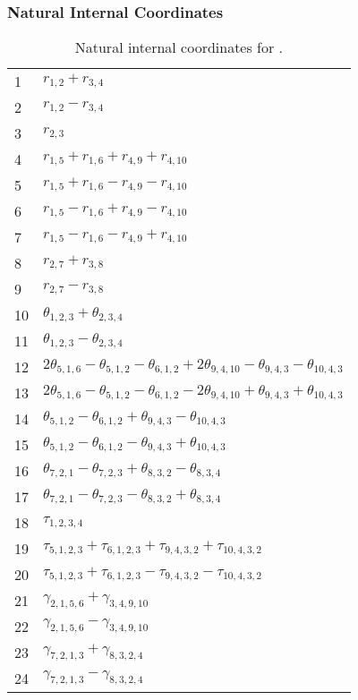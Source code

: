 \documentclass[10pt,oneside]{article}
\begin{document}
\begin{table}[h!]
\subsubsection*{Natural Internal Coordinates}
\centering
\caption{Natural internal coordinates for .}
\small
\begin{tabular}{ll}
\toprule
  1   & $r_{1,2} + r_{3,4}$ \\
  2   & $r_{1,2} - r_{3,4}$ \\
  3   & $r_{2,3}$ \\
  4   & $r_{1,5} + r_{1,6} + r_{4,9} + r_{4,10}$ \\
  5   & $r_{1,5} + r_{1,6} - r_{4,9} - r_{4,10}$ \\
  6   & $r_{1,5} - r_{1,6} + r_{4,9} - r_{4,10}$ \\
  7   & $r_{1,5} - r_{1,6} - r_{4,9} + r_{4,10}$ \\
  8   & $r_{2,7} + r_{3,8}$ \\
  9   & $r_{2,7} - r_{3,8}$ \\
  10  & $\theta_{1,2,3} + \theta_{2,3,4}$ \\
  11  & $\theta_{1,2,3} - \theta_{2,3,4}$ \\
  12  & $2\theta_{5,1,6} - \theta_{5,1,2} - \theta_{6,1,2} + 2\theta_{9,4,10} - \theta_{9,4,3} - \theta_{10,4,3}$ \\
  13  & $2\theta_{5,1,6} - \theta_{5,1,2} - \theta_{6,1,2} - 2\theta_{9,4,10} + \theta_{9,4,3} + \theta_{10,4,3}$ \\
  14  & $\theta_{5,1,2} - \theta_{6,1,2} + \theta_{9,4,3} - \theta_{10,4,3}$ \\
  15  & $\theta_{5,1,2} - \theta_{6,1,2} - \theta_{9,4,3} + \theta_{10,4,3}$ \\
  16  & $\theta_{7,2,1} - \theta_{7,2,3} + \theta_{8,3,2} - \theta_{8,3,4}$ \\
  17  & $\theta_{7,2,1} - \theta_{7,2,3} - \theta_{8,3,2} + \theta_{8,3,4}$ \\
  18  & $\tau_{1,2,3,4}$ \\
  19  & $\tau_{5,1,2,3} + \tau_{6,1,2,3} + \tau_{9,4,3,2} + \tau_{10,4,3,2}$ \\
  20  & $\tau_{5,1,2,3} + \tau_{6,1,2,3} - \tau_{9,4,3,2} - \tau_{10,4,3,2}$ \\
  21  & $\gamma_{2,1,5,6} + \gamma_{3,4,9,10}$ \\
  22  & $\gamma_{2,1,5,6} - \gamma_{3,4,9,10}$ \\
  23  & $\gamma_{7,2,1,3} + \gamma_{8,3,2,4}$ \\
  24  & $\gamma_{7,2,1,3} - \gamma_{8,3,2,4}$ \\
\bottomrule
\end{tabular}
\end{table}
\end{document}
